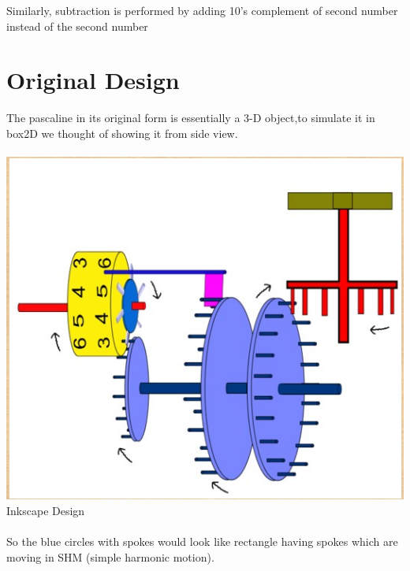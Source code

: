 \documentclass[11pt]{article}
\begin{document}
Similarly, subtraction is performed by adding 10's complement of second number instead of the second number

\section{Original Design}
The pascaline in its original form is essentially a 3-D object,to simulate it in box2D we thought of showing it from side view.
\\
\\
\includegraphics[scale=0.4]{../images/OriginalDesign.png}
Inkscape Design
\\
\\
So the blue circles with spokes would look like rectangle having spokes which are moving in SHM (simple harmonic motion).
\end{document}
